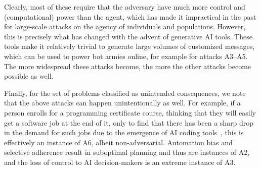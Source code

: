Clearly, most of these require that the adversary have much more control and (computational) power than the agent, which has made it impractical
in the past for large-scale attacks on the agency of individuals and populations. However, this is precisely what has changed with the
advent of generative AI tools. These tools make it relatively trivial to generate large volumes of customized messages, which can be used
to power bot armies online, for example for attacks A3--A5. The more widespread these attacks become, the more the other attacks become possible 
as well.

Finally, for the set of problems classified as unintended consequences, we note that the above attacks can happen unintentionally as well.
For example, if a person enrolls for a programming certificate course, thinking that they will easily get a software job at the end of it,
only to find that there has been a sharp drop in the demand for such jobs due to the emergence of AI coding tools~\citep{kessler24coding}, this
is effectively an instance of A6, albeit non-adversarial. Automation bias and selective adherence result in suboptimal planning and thus
are instances of A2, and the loss of control to AI decision-makers is an extreme instance of A3.

